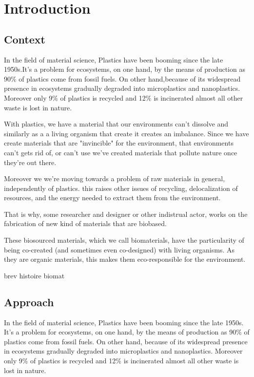 \chapter{Introduction}

\section{Context}
In the field of material science, Plastics have been booming since the late 1950s\cite{geyer2017production}.It's a problem for ecosystems, on one hand, by the means of production as 90\% of plastics come from fossil fuels. On other hand,because of its widespread presence in ecosystems gradually degraded into microplastics and nanoplastics. Moreover only 9\% of plastics is recycled and 12\% is incinerated almost all other waste is lost in nature\cite{natureeditorial}.

With plastics, we have a material that our environments can't dissolve and similarly as a a living organism that create it creates an imbalance. Since we have create materials that are "invincible" for the environment,  that environments can't gets rid of, or can't use we've created materials that pollute nature once they're out there.

Moreover we we're moving towards a problem of raw materials in general, independently of plastics. this raises other issues of recycling, delocalization of resources, and the energy needed to extract them from the environment.

That is why, some researcher and designer or other indistrual actor, works on the fabrication of new kind of materials that are biobased.
 
These biosourced materials, which we call biomaterials, have the particularity of being co-created (and sometimes even co-designed) with living organisms. As they are organic materials, this makes them eco-responsible for the environment. 

brev histoire biomat 
\section{Approach}

In the field of material science, Plastics have been booming since the late 1950s\cite{geyer2017production}.
It's a problem for ecosystems, on one hand, by the means of production as 90\% of plastics come from fossil fuels. On other hand,
because of its widespread presence in ecosystems gradually degraded into microplastics and nanoplastics.
Moreover only 9\% of plastics is recycled and 12\% is incinerated almost all other waste is lost in nature\cite{natureeditorial}.


